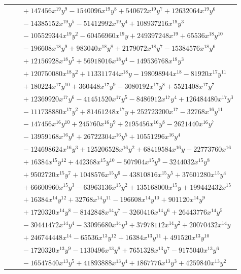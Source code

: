 \documentclass[11pt]{article}
\begin{document}
\begin{longtable}{@{}ll@{}}
 & $\quad +147456x^{19}y^{9}-1540096x^{19}y^{8}+540672x^{19}y^{7}+12632064x^{19}y^{6}$\\
 & $\quad -14385152x^{19}y^{5}-51412992x^{19}y^{4}+108937216x^{19}y^{3}$\\
 & $\quad -105529344x^{19}y^{2}-60456960x^{19}y+249397248x^{19}+65536x^{18}y^{10}$\\
 & $\quad -196608x^{18}y^{9}+983040x^{18}y^{8}+2179072x^{18}y^{7}-15384576x^{18}y^{6}$\\
 & $\quad +12156928x^{18}y^{5}+56918016x^{18}y^{4}-149536768x^{18}y^{3}$\\
 & $\quad +120750080x^{18}y^{2}+113311744x^{18}y-198098944x^{18}-81920x^{17}y^{11}$\\
 & $\quad +180224x^{17}y^{10}+360448x^{17}y^{9}-3080192x^{17}y^{8}+5521408x^{17}y^{7}$\\
 & $\quad +12369920x^{17}y^{6}-41451520x^{17}y^{5}-8486912x^{17}y^{4}+126484480x^{17}y^{3}$\\
 & $\quad -111738880x^{17}y^{2}+81461248x^{17}y+252723200x^{17}-32768x^{16}y^{11}$\\
 & $\quad -147456x^{16}y^{10}+245760x^{16}y^{9}+2195456x^{16}y^{8}-2621440x^{16}y^{7}$\\
 & $\quad -13959168x^{16}y^{6}+26722304x^{16}y^{5}+10551296x^{16}y^{4}$\\
 & $\quad -124698624x^{16}y^{3}+125206528x^{16}y^{2}+68419584x^{16}y-22773760x^{16}$\\
 & $\quad +16384x^{15}y^{12}+442368x^{15}y^{10}-507904x^{15}y^{9}-3244032x^{15}y^{8}$\\
 & $\quad +9502720x^{15}y^{7}+1048576x^{15}y^{6}-43810816x^{15}y^{5}+37601280x^{15}y^{4}$\\
 & $\quad +66600960x^{15}y^{3}-63963136x^{15}y^{2}+135168000x^{15}y+199442432x^{15}$\\
 & $\quad +16384x^{14}y^{12}+32768x^{14}y^{11}-196608x^{14}y^{10}+901120x^{14}y^{9}$\\
 & $\quad +1720320x^{14}y^{8}-8142848x^{14}y^{7}-3260416x^{14}y^{6}+26443776x^{14}y^{5}$\\
 & $\quad -30441472x^{14}y^{4}-33095680x^{14}y^{3}+37978112x^{14}y^{2}+20070432x^{14}y$\\
 & $\quad +246744448x^{14}-65536x^{13}y^{12}+16384x^{13}y^{11}+491520x^{13}y^{10}$\\
 & $\quad -1720320x^{13}y^{9}-1130496x^{13}y^{8}+7651328x^{13}y^{7}-9175040x^{13}y^{6}$\\
 & $\quad -16547840x^{13}y^{5}+41893888x^{13}y^{4}+1867776x^{13}y^{3}+4259840x^{13}y^{2}$\\

\end{longtable}
\end{document}
